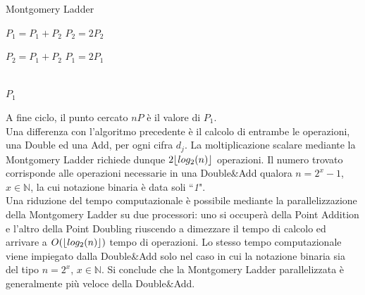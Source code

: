 \documentclass[a4paper,12pt]{tesiinfo}
\DeclarePairedDelimiter\floor{\lfloor}{\rfloor}
\begin{document}
\begin{algorithm}[H]
\caption{Montgomery Ladder}
\begin{algorithmic}


    
        \State $P_1 =P_1+P_2$
        \State $P_2 =2P_2$
        
    \Else
    
        \State $P_2 =P_1+P_2$
        \State $P_1 =2P_1$
        
    \EndIf
\EndFor\\
\Return $P_1$
\end{algorithmic}
\end{algorithm}
A fine ciclo, il punto cercato $nP$ \`e il valore di $P_1$.
\\
Una differenza con l'algoritmo precedente \`e il calcolo di entrambe le operazioni, una Double ed una Add, per ogni cifra $d_j$. La moltiplicazione scalare mediante la Montgomery Ladder richiede dunque $2 \floor{log_2(n)}$ operazioni. Il numero trovato corrisponde alle operazioni necessarie in una Double\&Add qualora $n=2^x-1$, $x\in \mathbb{N}$, la cui notazione binaria \`e data soli ``\emph{1}".
\\
Una riduzione del tempo computazionale \`e possibile mediante la parallelizzazione della Montgomery Ladder su due processori: uno si occuper\`a della Point Addition e l'altro della Point Doubling riuscendo a dimezzare il tempo di calcolo ed arrivare a $O(\floor{log_2(n)})$ tempo di operazioni. Lo stesso tempo computazionale viene impiegato dalla Double\&Add solo nel caso in cui la notazione binaria sia del tipo $n=2^x$, $x\in \mathbb{N}$. Si conclude che la Montgomery Ladder parallelizzata \`e generalmente pi\`u veloce della Double$\&$Add.
%
%
%
%
%
%
%
%
%
%
%
\end{document}
